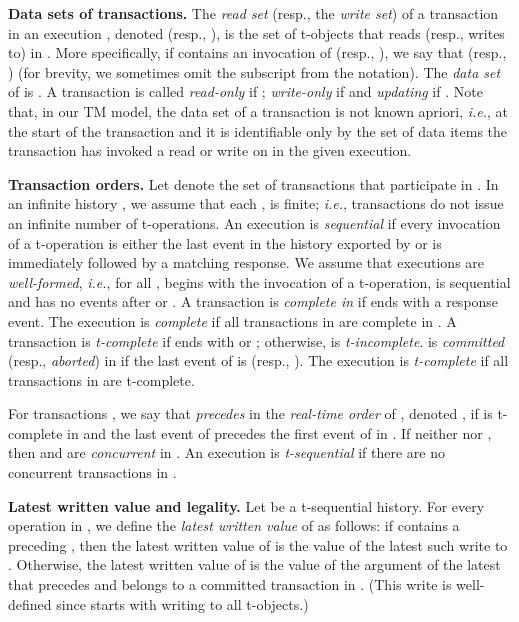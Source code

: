 \vspace{1mm}\noindent\textbf{Data sets of transactions.}
The \emph{read set} (resp., the \emph{write set}) of a transaction  in an execution ,
denoted  (resp., ), is the set of t-objects that  reads (resp., writes to) in .
More specifically, if  contains an invocation of  (resp., ), we say
that  (resp., ) (for brevity, we sometimes omit the subscript  from the notation).
The \emph{data set} of  is .
A transaction is called \emph{read-only} if ; 
\emph{write-only} if  and
\emph{updating} if .
Note that, in our TM model, the data set of a transaction is not known apriori, \emph{i.e.}, at the start of the transaction
and it is identifiable only by the set of data items the transaction has invoked a read or write on in the given execution.

\vspace{1mm}\noindent\textbf{Transaction orders.}
Let  denote the set of transactions that participate in .
In an infinite history , 
we assume that each ,  is finite;
\emph{i.e.}, transactions do not issue an infinite number of t-operations.
An execution  is \emph{sequential} if every invocation of
a t-operation is either the last event in the history  exported by  or
is immediately followed by a matching response.
We assume that executions are \emph{well-formed}, \emph{i.e.}, for all ,  begins with the invocation of a t-operation, is
sequential and has no events after  or .
A transaction  is \emph{complete in } if
 ends with a response event.
The execution  is \emph{complete} if all transactions in 
are complete in .
A transaction  is \emph{t-complete} if 
ends with  or ; otherwise,  is \emph{t-incomplete}.
 is \emph{committed} (resp., \emph{aborted}) in 
if the last event of  is  (resp., ).
The execution  is \emph{t-complete} if all transactions in
 are t-complete.

For transactions , we say that  \emph{precedes}
 in the \emph{real-time order} of , denoted ,
if  is t-complete in  and
the last event of  precedes the first event of  in .
If neither  nor ,
then  and  are \emph{concurrent} in .
An execution  is \emph{t-sequential} if there are no concurrent
transactions in .

\vspace{1mm}\noindent\textbf{Latest written value and legality.}
Let  be a t-sequential history.
For every operation  in ,
we define the \emph{latest written value} of  as follows:
if  contains a  preceding ,
then the latest written value of  is the value of the latest such write to .
Otherwise,
the latest written value of  is the value
of the argument of the latest  that precedes
 and belongs to a committed transaction in .
(This write is well-defined since  starts with  writing to
all t-objects.)

